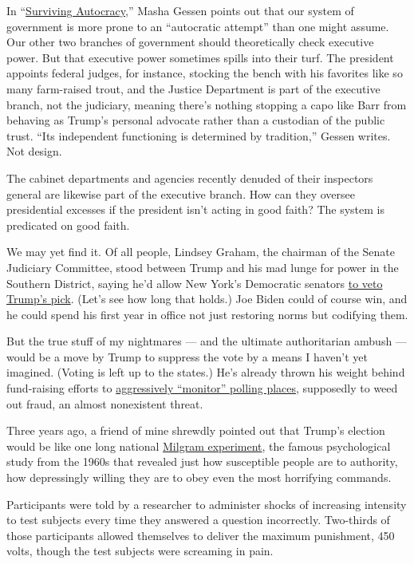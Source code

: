 In
``\href{https://www.nytimes.com/2020/06/03/books/review-surviving-autocracy-masha-gessen.html}{Surviving
Autocracy},'' Masha Gessen points out that our system of government is
more prone to an ``autocratic attempt'' than one might assume. Our other
two branches of government should theoretically check executive power.
But that executive power sometimes spills into their turf. The president
appoints federal judges, for instance, stocking the bench with his
favorites like so many farm-raised trout, and the Justice Department is
part of the executive branch, not the judiciary, meaning there's nothing
stopping a capo like Barr from behaving as Trump's personal advocate
rather than a custodian of the public trust. ``Its independent
functioning is determined by tradition,'' Gessen writes. Not design.

The cabinet departments and agencies recently denuded of their
inspectors general are likewise part of the executive branch. How can
they oversee presidential excesses if the president isn't acting in good
faith? The system is predicated on good faith.

We may yet find it. Of all people, Lindsey Graham, the chairman of the
Senate Judiciary Committee, stood between Trump and his mad lunge for
power in the Southern District, saying he'd allow New York's Democratic
senators
\href{https://www.axios.com/geoffrey-berman-lindsey-graham-new-york-attorney-a388fc90-69a9-42f5-933d-3f0fe558f9d2.html}{to
veto Trump's pick}. (Let's see how long that holds.) Joe Biden could of
course win, and he could spend his first year in office not just
restoring norms but codifying them.

But the true stuff of my nightmares --- and the ultimate authoritarian
ambush --- would be a move by Trump to suppress the vote by a means I
haven't yet imagined. (Voting is left up to the states.) He's already
thrown his weight behind fund-raising efforts to
\href{https://www.nytimes.com/2020/05/18/us/Voting-republicans-trump.html}{aggressively
``monitor'' polling places}, supposedly to weed out fraud, an almost
nonexistent threat.

Three years ago, a friend of mine shrewdly pointed out that Trump's
election would be like one long national
\href{https://www.simplypsychology.org/milgram.html}{Milgram
experiment}, the famous psychological study from the 1960s that revealed
just how susceptible people are to authority, how depressingly willing
they are to obey even the most horrifying commands.

Participants were told by a researcher to administer shocks of
increasing intensity to test subjects every time they answered a
question incorrectly. Two-thirds of those participants allowed
themselves to deliver the maximum punishment, 450 volts, though the test
subjects were screaming in pain.

